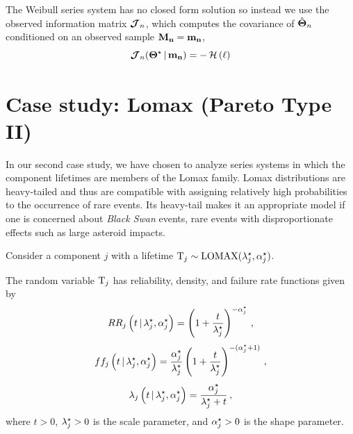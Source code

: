 \documentclass[
    11pt,
    extrafontsizes,
    article,
    oldfontcommands,
    final,
    oneside,
    openany,
    hidelinks]{memoir}
\begin{document}
The Weibull series system has no closed form solution so instead we use the observed information matrix $\operatorname{\boldsymbol{\mathcal{J}}}_n$,
which computes the covariance of $\hat{\boldsymbol{\Theta}}_n$ conditioned on an observed sample $\boldsymbol{\mathbf{M_n}} = \boldsymbol{\mathbf{m_n}}$,
\begin{equation}
\label{info_matrix_weibull}
    \operatorname{\boldsymbol{\mathcal{J}}}_n({\boldsymbol{\Theta}}^{\star} {\,|\,} \boldsymbol{\mathbf{m_n}}) = -\operatorname{\mathcal{H}}\left(\ell\right)
\end{equation}

\chapter{Case study: Lomax (Pareto Type II)}
In our second case study, we have chosen to analyze series systems in which the component lifetimes are members of the Lomax family. Lomax distributions are heavy-tailed and thus are compatible with assigning relatively high probabilities to the occurrence of rare events. Its heavy-tail makes it an appropriate model if one is concerned about \emph{Black Swan} events, rare events with disproportionate effects such as large asteroid impacts.

Consider a component $j$ with a lifetime $\mathrm{T}_j \sim \text{LOMAX}({\lambda}^{\star}_j, {\alpha}^{\star}_j)$.
\begin{definition}
\label{def:pareto_lifetime_functions}
The random variable $\mathrm{T}_j$ has reliability, density, and failure rate functions given by
\begin{equation}
R{R_j} \left (t {\,|\,} {\lambda}^{\star}_j, {\alpha}^{\star}_j \right ) =
    \left (1 + \frac{t}{{\lambda}^{\star}_j} \right )^{-{\alpha}^{\star}_j}\,,
\end{equation}
\begin{equation}
f{f_j} \left ( t {\,|\,} {\lambda}^{\star}_j, {\alpha}^{\star}_j \right ) =
    \frac{{\alpha}^{\star}_j}{{\lambda}^{\star}_j} \left (1 + \frac{t}{{\lambda}^{\star}_j} \right )^{-({\alpha}^{\star}_j + 1)}\,,
\end{equation}
\begin{equation}
\lambda_j \left ( t {\,|\,} {\lambda}^{\star}_j, {\alpha}^{\star}_j \right ) =
    \frac{{\alpha}^{\star}_j}{{\lambda}^{\star}_j + t}\,,
\end{equation}
where $t > 0$, ${\lambda}^{\star}_j > 0$ is the scale parameter, and ${\alpha}^{\star}_j > 0$ is the shape parameter.
\end{definition}
\end{document}
